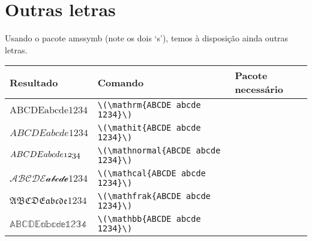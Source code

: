 \documentclass[article,openany]{memoir}
\newcommand{\pacote}[1]{\textsf{#1}}
\begin{document}
\chapter{Outras letras}

Usando o pacote \pacote{amssymb} (note os dois `s'), temos à
disposição ainda outras letras.

\begin{tabular}{lll}
Resultado & Comando & Pacote necessário\\\toprule
\(\mathrm{ABCDE abcde1234}\) & \verb/\(\mathrm{ABCDE abcde 1234}\)/ \\
\(\mathit{ABCDE abcde1234}\) & \verb/\(\mathit{ABCDE abcde 1234}\)/ \\
\(\mathnormal{ABCDE abcde1234}\) & \verb/\(\mathnormal{ABCDE abcde 1234}\)/ \\
\(\mathcal{ABCDE abcde1234}\) & \verb/\(\mathcal{ABCDE abcde 1234}\)/ \\
\(\mathfrak{ABCDE abcde1234}\) & \verb/\(\mathfrak{ABCDE abcde 1234}\)/ \\
\(\mathbb{ABCDE abcde1234}\) & \verb/\(\mathbb{ABCDE abcde 1234}\)/ \\
\end{tabular}
\end{document}
